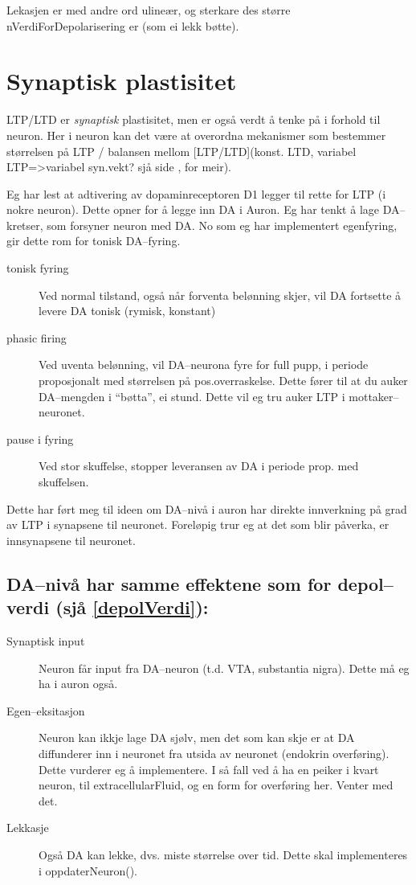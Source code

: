Lekasjen er med andre ord ulineær, og sterkare des større nVerdiForDepolarisering er (som ei lekk bøtte).

\section{Synaptisk plastisitet}
LTP/LTD er \emph{synaptisk} plastisitet, men er også verdt å tenke på i forhold til neuron. Her i neuron kan det være at overordna mekanismer som bestemmer størrelsen på LTP / balansen mellom [LTP/LTD](konst. LTD, variabel LTP=>variabel syn.vekt? sjå side \pageref{diskursOmLTPLTD}, for meir).

Eg har lest at adtivering av dopaminreceptoren D1 legger til rette for LTP (i nokre neuron). Dette opner for å legge inn DA i Auron. 
Eg har tenkt å lage DA--kretser, som forsyner neuron med DA. No som eg har implementert egenfyring, gir dette rom for tonisk DA--fyring.
\begin{description}
	\item[tonisk fyring] Ved normal tilstand, også når forventa belønning skjer, vil DA fortsette å levere DA tonisk (rymisk, konstant)
	\item[phasic firing] Ved uventa belønning, vil DA--neurona fyre for full pupp, i periode proposjonalt med størrelsen på pos.overraskelse. Dette fører til at du auker DA--mengden i ``bøtta'', ei stund. Dette vil eg tru auker LTP i mottaker--neuronet.
	\item[pause i fyring] Ved stor skuffelse, stopper leveransen av DA i periode prop. med skuffelsen.
\end{description}

Dette har ført meg til ideen om DA--nivå i auron har direkte innverkning på grad av LTP i synapsene til neuronet. Foreløpig trur eg at det som blir påverka, er innsynapsene til neuronet.

\subsection{DA--nivå har samme effektene som for depol--verdi (sjå \ref{depolVerdi}):} \label{DA_mekanismer}
\begin{description}
	\item[Synaptisk input] Neuron får input fra DA--neuron (t.d. VTA, substantia nigra). Dette må eg ha i auron også.
	\item[Egen--eksitasjon] Neuron kan ikkje lage DA sjølv, men det som kan skje er at DA diffunderer inn i neuronet fra utsida av neuronet (endokrin overføring). Dette vurderer eg å implementere. I så fall ved å ha en peiker i kvart neuron, til extracellularFluid, og en form for overføring her. Venter med det.
	\item[Lekkasje] Også DA kan lekke, dvs. miste størrelse over tid. Dette skal implementeres i oppdaterNeuron().
\end{description}


